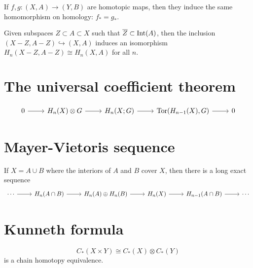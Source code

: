 \documentclass[12pt, oneside]{book}
\begin{document}
\begin{proposition}
    If $f,g: (X,A) \to (Y,B)$ are homotopic maps, then they induce the same homomorphism on homology: $f_* = g_*$.
\end{proposition}


\begin{theorem}[Excision]
    Given subspaces $Z \subset A \subset X$ such that $\overline{Z} \subset \operatorname{\operatorname{Int}}(A)$, then the inclusion $(X- Z, A- Z) \hookrightarrow (X,A)$ induces an isomorphism $H_n(X-Z,A-Z) \cong H_n(X,A)$ for all $n$.
\end{theorem}




\section{The universal coefficient theorem}

\begin{theorem}
    \begin{equation*}
        \begin{tikzcd}
            0 \arrow[r] & H_n(X) \otimes G \arrow[r] & H_n(X;G) \arrow[r] & \Tor(H_{n-1}(X),G) \arrow[r] & 0
        \end{tikzcd}
    \end{equation*}
\end{theorem}

\section{Mayer-Vietoris sequence}
\begin{theorem}
    If $X = A \cup B$ where the interiors of $A$ and $B$ cover $X$, then there is a long exact sequence
    \begin{equation*}
        \begin{tikzcd}
            \cdots \arrow[r] & H_n(A\cap B) \arrow[r] & H_n(A)\oplus H_n(B) \arrow[r] & H_n(X) \arrow[r] & H_{n-1}(A\cap B) \arrow[r] & \cdots
        \end{tikzcd}
    \end{equation*}
\end{theorem}

\section{Kunneth formula}

\begin{theorem}
    \begin{equation*}
        C_*(X\times Y) \cong  C_*(X)\otimes C_*(Y)
    \end{equation*}
    is a chain homotopy equivalence.
\end{theorem}
\end{document}
